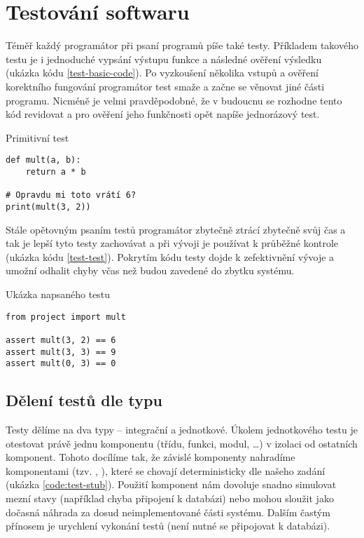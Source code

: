 \section{Testování softwaru}

Téměř každý programátor při psaní programů píše také testy.
Příkladem takového testu je i jednoduché vypsání výstupu funkce a následné ověření výsledku (ukázka kódu \ref{test-basic-code}).
Po vyzkoušení několika vstupů a ověření korektního fungování programátor test smaže a začne se věnovat jiné části programu.
Nicméně je velmi pravděpodobné, že v budoucnu se rozhodne tento kód revidovat a pro ověření jeho funkčnosti opět napíše jednorázový test.

\begin{listing}[ht]
\caption{\label{test-basic-code}Primitivní test}
\begin{verbatim}
def mult(a, b):
    return a * b

# Opravdu mi toto vrátí 6?
print(mult(3, 2))
\end{verbatim}
\end{listing}

Stále opětovným psaním testů programátor zbytečně ztrácí zbytečně svůj čas a tak je lepší tyto testy zachovávat a při vývoji je používat k průběžné kontrole (ukázka kódu \ref{test-test}).
Pokrytím kódu testy dojde k zefektivnění vývoje a umožní odhalit chyby včas než budou zavedené do zbytku systému.

\begin{listing}[ht]
\caption{\label{test-test}Ukázka napsaného testu}
\begin{verbatim}
from project import mult

assert mult(3, 2) == 6
assert mult(3, 3) == 9
assert mult(0, 3) == 0
\end{verbatim}
\end{listing}

\subsection{Dělení testů dle typu}

Testy dělíme na dva typy -- integrační a jednotkové.
Úkolem jednotkového testu je otestovat právě jednu komponentu (třídu, funkci, modul, \ldots) v izolaci od ostatních komponent.
Tohoto docílíme tak, že závislé komponenty nahradíme komponentami  (tzv. ,  \cite{fowler_mocks}), které se chovají deterministicky dle našeho zadání (ukázka \ref{code:test-stub}).
Použití  komponent nám dovoluje snadno simulovat mezní stavy (například chyba připojení k databázi) nebo mohou sloužit jako dočasná náhrada za dosud neimplementované části systému.
Dalším častým přínosem je urychlení vykonání testů (není nutné se připojovat k databázi).
\cite{zemek_integracni_x_jednotkove}

